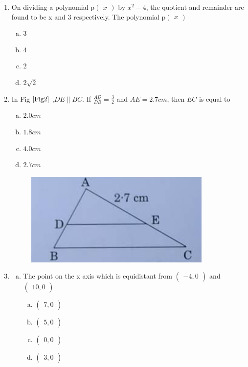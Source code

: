 \documentclass[journal,12pt,twocolumn]{IEEEtran}
\newcommand{\myvec}[1]{\ensuremath{\begin{pmatrix}#1\end{pmatrix}}}
\begin{document}
\begin{enumerate}[label=1.\arabic*]
 \item On dividing a polynomial p$\myvec{x}$ by $x^2 - 4$, the quotient and remainder are found to be x and 3 respectively. The polynomial p$\myvec{x}$\\
 \begin{enumerate}[(a)]
    \item $3$\\
    \item $4$\\ 
    \item $2$\\
    \item $2\sqrt{2}$\\
\end{enumerate}

\item In Fig $\ref{Fig2}$ ,$DE \parallel BC$. If $\frac{AD}{DB} = \frac{3}{2}$ and $AE = 2.7cm$, then $EC$ is equal to \\
\begin{enumerate}[(a)]
    \item $2.0 cm$\\
    \item $1.8 cm$\\ 
    \item $4.0 cm$\\
    \item $2.7 cm$\\
\end{enumerate}

\begin{figure}[h!]
    \centering
    \includegraphics[width=0.5\columnwidth,center]{Fig2.png}
	\caption{}
	\label{Fig2}
 \end{figure}
 
\item \begin{enumerate}[a)]
\item The point on the x axis which is equidistant from $\myvec{-4,0}$ and $\myvec{10,0}$\\
\begin{enumerate}[(a)]
\item $\myvec{7,0}$\\
\item $\myvec{5,0}$\\ 
\item $\myvec{0,0}$\\
\item $\myvec{3,0}$\\
\end{enumerate}


\end{enumerate}
\end{enumerate}
\end{document}
